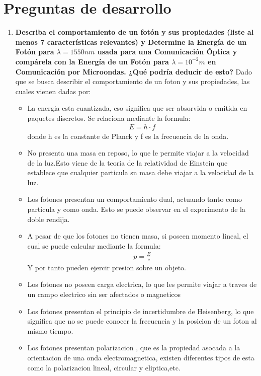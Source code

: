 \section{Preguntas de desarrollo}
\begin{enumerate}
	\item \textbf{Describa el comportamiento de un fotón y sus propiedades (liste al menos 7
	características relevantes) y Determine la Energía de un Fotón para $\lambda =1550nm$ usada para una Comunicación Óptica y compárela con la Energía de un Fotón para $\lambda =10^{-2}m$ en Comunicación por Microondas. ¿Qué podría deducir de esto?}
Dado que se busca describir el comportamiento de un foton y sus propiedades, las cuales vienen dadas por:
\begin{itemize}
	\item La energia esta cuantizada, eso significa que ser absorvida o emitida en paquetes discretos. Se relaciona mediante la formula:
	\begin{align}
		E = h \cdot f
	\end{align}
	donde h es la constante de Planck y f es la frecuencia de la onda.
	\item No presenta una masa en reposo, lo que le permite viajar a la velocidad de la luz.Esto viene de la teoria de la relatividad de Einstein que establece que cualquier particula sn masa debe viajar a la velocidad de la luz.
	\item Los fotones presentan un comportamiento dual, actuando tanto como particula y como onda. Esto se puede observar en el experimento de la doble rendija.
	\item A pesar de que los fotones no tienen masa, si poseen momento lineal, el cual se puede calcular mediante la formula:
	\begin{align}
		p = \frac{E}{c}
	\end{align}
	Y por tanto pueden ejercir presion sobre un objeto.
	\item Los fotones no poseen carga electrica, lo que les permite viajar a traves de un campo electrico sin ser afectados o magneticos
	\item Los fotones presentan el principio de incertidumbre de Heisenberg, lo que significa que no se puede conocer la frecuencia y la posicion de un foton al mismo tiempo.
	\item Los fotones presentan polarizacion , que es la propiedad asocada a la orientacion de una onda electromagnetica, existen diferentes tipos de esta como la polarizacion lineal, circular y eliptica,etc.
\end{itemize}

\end{enumerate}
